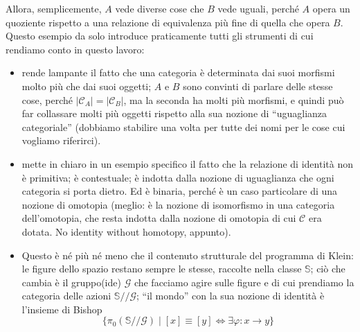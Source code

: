 \documentclass{amsart}
\begin{document}
Allora, semplicemente, $A$ vede diverse cose che $B$ vede uguali, perché $A$ opera un quoziente rispetto a una relazione di equivalenza più fine di quella che opera $B$. Questo esempio da solo introduce praticamente tutti gli strumenti di cui rendiamo conto in questo lavoro:
\begin{itemize}
	\item rende lampante il fatto che una categoria è determinata dai suoi morfismi molto più che dai suoi oggetti; $A$ e $B$ sono convinti di parlare delle stesse cose, perché $|\mathcal C_A|=|\mathcal C_B|$, ma la seconda ha molti più morfismi, e quindi può far collassare molti più oggetti rispetto alla sua nozione di ``uguaglianza categoriale'' (dobbiamo stabilire una volta per tutte dei nomi per le cose cui vogliamo riferirci).
	\item mette in chiaro in un esempio specifico il fatto che la relazione di identità non è primitiva; è contestuale; è indotta dalla nozione di uguaglianza che ogni categoria si porta dietro. Ed è binaria, perché è un caso particolare di una nozione di omotopia (meglio: è la nozione di isomorfismo in una categoria dell'omotopia, che resta indotta dalla nozione di omotopia di cui $\mathcal C$ era dotata. No identity without homotopy, appunto).
	\item Questo è né più né meno che il contenuto strutturale del programma di Klein: le figure dello spazio restano sempre le stesse, raccolte nella classe $\mathbb S$; ciò che cambia è il gruppo(ide) $\mathcal G$ che facciamo agire sulle figure e di cui prendiamo la categoria delle azioni $\mathbb S /\!\!/\mathcal G$; ``il mondo'' con la sua nozione di identità è l'insieme di Bishop
	      \[\Big\{ \pi_0(\mathbb S/\!\!/\mathcal G) \mid [x] \equiv [y] \iff \exists \varphi : x \to y\Big\}\]

\end{itemize}
\end{document}
